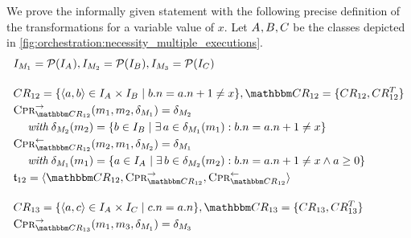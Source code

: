 We prove the informally given statement with the following precise definition of the transformations for a variable value of $x$.
Let $A_{}, B_{}, C_{}$ be the classes depicted in \autoref{fig:orchestration:necessity_multiple_executions}.
\begin{align*}
    & 
    \metamodelinstanceset{M}{1} = \mathcal{P}(\instances{\class{A}{}}), %
    \metamodelinstanceset{M}{2} = \mathcal{P}(\instances{\class{B}{}}), %
    \metamodelinstanceset{M}{3} = \mathcal{P}(\instances{\class{C}{}}) \\[1em]
    &
    \consistencyrelation{CR}{12} = \setted{\tupled{a,b} \in \instances{\class{A}{}} \times \instances{\class{B}{}} \mid b.n = a.n + 1 \neq x}, \consistencyrelationset{CR}_{12} = \setted{\consistencyrelation{CR}{12}, \consistencyrelation{CR}{12}^T} \\
    &
    \consistencypreservationrule{\consistencyrelationset{CR}_{12}}^{\rightarrow}(\model{m}{1}, \model{m}{2}, \change{\metamodel{M}{1}}) = \change{\metamodel{M}{2}} \\
    & \formulaskip
    \withmath \change{\metamodel{M}{2}}(\model{m}{2}) = \setted{b \in \instances{\class{B}{}} \mid \exists a \in \change{\metamodel{M}{1}}(\model{m}{1}) : b.n = a.n + 1 \neq x} \\
    & 
    \consistencypreservationrule{\consistencyrelationset{CR}_{12}}^{\leftarrow}(\model{m}{2}, \model{m}{1}, \change{\metamodel{M}{2}}) = \change{\metamodel{M}{1}} \\
    & \formulaskip
    \withmath \change{\metamodel{M}{1}}(\model{m}{1}) = \setted{a \in \instances{\class{A}{}} \mid \exists b \in \change{\metamodel{M}{2}}(\model{m}{2}) : b.n = a.n + 1 \neq x \land a \geq 0} \\
    &
    \transformation{t}_{12} = \tupled{\consistencyrelationset{CR}_{12}, \consistencypreservationrule{\consistencyrelationset{CR}_{12}}^{\rightarrow}, \consistencypreservationrule{\consistencyrelationset{CR}_{12}}^{\leftarrow}} \\[1em]
    & 
    \consistencyrelation{CR}{13} = \setted{\tupled{a,c} \in \instances{\class{A}{}} \times \instances{\class{C}{}} \mid c.n = a.n}, \consistencyrelationset{CR}_{13} = \setted{\consistencyrelation{CR}{13}, \consistencyrelation{CR}{13}^T} \\
    & 
    \consistencypreservationrule{\consistencyrelationset{CR}_{13}}^{\rightarrow}(\model{m}{1}, \model{m}{3}, \change{\metamodel{M}{1}}) = \change{\metamodel{M}{3}} \\

\end{align*}
